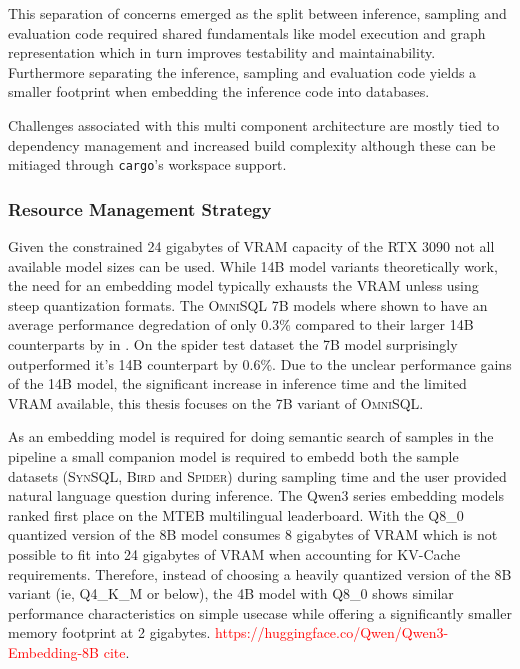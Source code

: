 This separation of concerns emerged as the split between inference, sampling
and evaluation code required shared fundamentals like model execution and graph
representation which in turn improves testability and maintainability. Furthermore
separating the inference, sampling and evaluation code yields a smaller
footprint when embedding the inference code into databases.

Challenges associated with this multi component architecture are mostly tied to
dependency management and increased build complexity although these can be
mitiaged through \texttt{cargo}'s workspace support.

\subsubsection{Resource Management Strategy}

Given the constrained 24 gigabytes of VRAM capacity of the RTX 3090 not all
available model sizes can be used. While 14B model variants theoretically work,
the need for an embedding model typically exhausts the VRAM unless using
steep quantization formats. The \textsc{OmniSQL} 7B models where shown to have
an average performance degredation of only 0.3\% compared to their larger 14B
counterparts by \citeauthor{OmniSQL} in \citeyear{OmniSQL}. On the spider test
dataset the 7B model surprisingly outperformed it's 14B counterpart by 0.6\%.
Due to the unclear performance gains of the 14B model, the significant increase
in inference time and the limited VRAM available, this thesis focuses on the 7B
variant of \textsc{OmniSQL}.

As an embedding model is required for doing semantic search of samples in the
pipeline a small companion model is required to embedd both the sample datasets
(\textsc{SynSQL}, \textsc{Bird} and \textsc{Spider}) during sampling time and
the user provided natural language question during inference. The Qwen3 series
embedding models ranked first place on the MTEB multilingual leaderboard. With
the Q8\_0 quantized version of the 8B model consumes 8 gigabytes of VRAM which
is not possible to fit into 24 gigabytes of VRAM when accounting for KV-Cache
requirements. Therefore, instead of choosing a heavily quantized version of the
8B variant (ie, Q4\_K\_M or below), the 4B model with Q8\_0 shows similar
performance characteristics on simple usecase while offering a significantly
smaller memory footprint at 2 gigabytes.
\textcolor{red}{https://huggingface.co/Qwen/Qwen3-Embedding-8B cite}.

